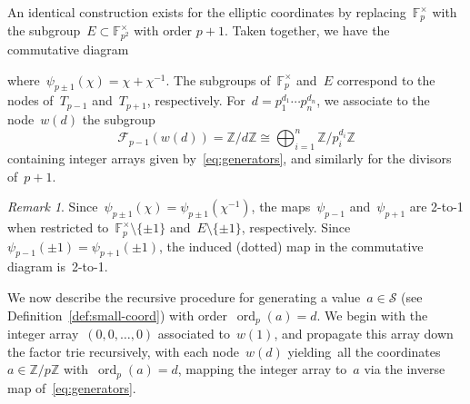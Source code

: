 \documentclass{article}
\DeclareMathOperator{\ord}{ord}
\theoremstyle{definition}
\theoremstyle{remark}
\newtheorem{remark}{Remark}
\begin{document}
An identical construction exists for the elliptic coordinates by replacing~$\mathbb{F}_p^\times$ with the subgroup~$E \subset \mathbb{F}_{p^2}^\times$ with order $p + 1$.
Taken together, we have the commutative diagram
\begin{center}
\end{center}
where~$\psi_{p \pm 1}(\chi) = \chi + \chi^{-1}$.
The subgroups of~$\mathbb{F}_p^\times$ and~$E$ correspond to the nodes of~$T_{p - 1}$ and~$T_{p + 1}$, respectively.
For~$d = p_1^{d_1} \cdots p_n^{d_n}$, we associate to the node~$w(d)$ the subgroup
\[ \mathcal{F}_{p - 1}(w(d)) = \mathbb{Z} / d\mathbb{Z} \cong \bigoplus_{i = 1}^n \mathbb{Z} / p_i^{d_i}\mathbb{Z} \]
containing integer arrays given by~\eqref{eq:generators}, and similarly for the divisors of~$p + 1$.

\begin{remark}\label{rmk:two-to-one}
    Since~$\psi_{p \pm 1}(\chi) = \psi_{p \pm 1}(\chi^{-1})$, the maps~$\psi_{p - 1}$ and~$\psi_{p + 1}$ are 2-to-1 when restricted to~$\mathbb{F}_p^\times \setminus \{\pm 1\}$ and~$E \setminus \{\pm 1\}$, respectively.
    Since~$\psi_{p - 1}(\pm 1) = \psi_{p + 1}(\pm 1)$, the induced (dotted) map in the commutative diagram is~2-to-1.
\end{remark}

We now describe the recursive procedure for generating a value~$a \in \mathcal{S}$ (see Definition~\ref{def:small-coord}) with order~$\ord_p(a) = d$.
We begin with the integer array~$(0, 0, \ldots, 0)$ associated to~$w(1)$, and propagate this array down the factor trie recursively, with each node~$w(d)$ yielding\footnotemark\ all the coordinates~$a \in \mathbb{Z} / p\mathbb{Z}$ with~$\ord_p(a) = d$, mapping the integer array to~$a$ via the inverse map of~\eqref{eq:generators}.
\end{document}
